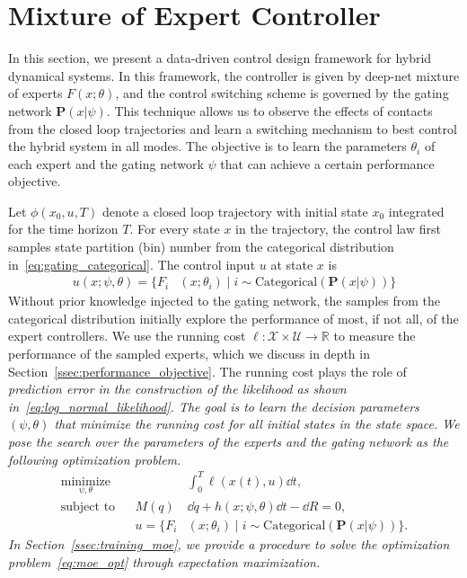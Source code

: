 \section{Mixture of Expert Controller}
\label{sec:moe_methods}

In this section, we present a data-driven control design framework for hybrid
dynamical systems. 
%
In this framework, the controller is given by deep-net mixture of experts
$F(x;\theta)$, and the control switching scheme is governed by the gating
network $\mathbf{P}(x|\psi)$.
%
This technique allows us to observe the effects of contacts from the closed loop
trajectories  and learn a switching mechanism to best control the hybrid system
in all modes.
%
The objective is to learn the parameters $\theta_i$ of each expert and the
gating network $\psi$ that can achieve a certain performance objective.

%
Let $\phi(x_0, u, T)$ denote a closed loop trajectory with initial state $x_0$
integrated for the time horizon $T$.
%
For every state $x$ in the trajectory, the control law first samples state
partition (bin) number from the categorical distribution
in~\eqref{eq:gating_categorical}.
%
The control input $u$ at state $x$ is
\begin{align*}
    u(x; \psi, \theta) = \{F_i&(x; \theta_i) \; | \; i  \sim \text{Categorical} (\mathbf{P}(x| \psi)) \}
\end{align*} 
%
Without prior knowledge injected to the gating network, the samples from the
categorical distribution initially explore the performance of most, if not all,
of the expert controllers.
%
We use the running cost $\ell : \mathcal{X} \times \mathcal{U} \rightarrow
\mathbb{R}$ to measure the performance of the sampled experts, which we discuss
in depth in Section~\ref{ssec:performance_objective}.
%
The running cost plays the role of \it{prediction error} \normalfont in the
construction of the likelihood as shown in~\eqref{eq:log_normal_likelihood}.
%
The goal is to learn the decision parameters $(\psi, \theta)$ that minimize the
running cost for all initial states in the state space.
%
We pose the search over the parameters of the experts and the gating network as the following optimization problem.
\begin{equation}
    \begin{aligned}
        \underset{\psi, \theta}{\textrm{minimize}} 
        & & & \int_0^T \ell (x(t),u) \dd t , \\%
        \textrm{subject to}
        & & M(q) &\dd \dot{q} + h(x; \psi, \theta)\dd t - \dd R  = 0,\\%
        & & u = \{F_i&(x; \theta_i) \; | \; i  \sim \text{Categorical} (\mathbf{P}(x| \psi)) \}.
    \end{aligned}
    \label{eq:moe_opt}
\end{equation}
%
In Section~\ref{ssec:training_moe}, we provide a procedure to solve the
optimization problem~\eqref{eq:moe_opt} through expectation maximization. 

